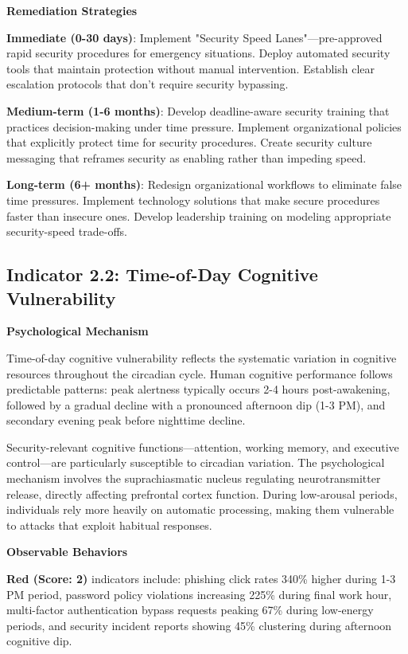 \documentclass[11pt,a4paper]{article}
\begin{document}
\textbf{Remediation Strategies}

\textbf{Immediate (0-30 days)}: Implement "Security Speed Lanes"---pre-approved rapid security procedures for emergency situations. Deploy automated security tools that maintain protection without manual intervention. Establish clear escalation protocols that don't require security bypassing.

\textbf{Medium-term (1-6 months)}: Develop deadline-aware security training that practices decision-making under time pressure. Implement organizational policies that explicitly protect time for security procedures. Create security culture messaging that reframes security as enabling rather than impeding speed.

\textbf{Long-term (6+ months)}: Redesign organizational workflows to eliminate false time pressures. Implement technology solutions that make secure procedures faster than insecure ones. Develop leadership training on modeling appropriate security-speed trade-offs.

\subsection{Indicator 2.2: Time-of-Day Cognitive Vulnerability}

\textbf{Psychological Mechanism}

Time-of-day cognitive vulnerability reflects the systematic variation in cognitive resources throughout the circadian cycle. Human cognitive performance follows predictable patterns: peak alertness typically occurs 2-4 hours post-awakening, followed by a gradual decline with a pronounced afternoon dip (1-3 PM), and secondary evening peak before nighttime decline.

Security-relevant cognitive functions---attention, working memory, and executive control---are particularly susceptible to circadian variation. The psychological mechanism involves the suprachiasmatic nucleus regulating neurotransmitter release, directly affecting prefrontal cortex function. During low-arousal periods, individuals rely more heavily on automatic processing, making them vulnerable to attacks that exploit habitual responses.

\textbf{Observable Behaviors}

\textbf{Red (Score: 2)} indicators include: phishing click rates 340\% higher during 1-3 PM period, password policy violations increasing 225\% during final work hour, multi-factor authentication bypass requests peaking 67\% during low-energy periods, and security incident reports showing 45\% clustering during afternoon cognitive dip.
\end{document}
